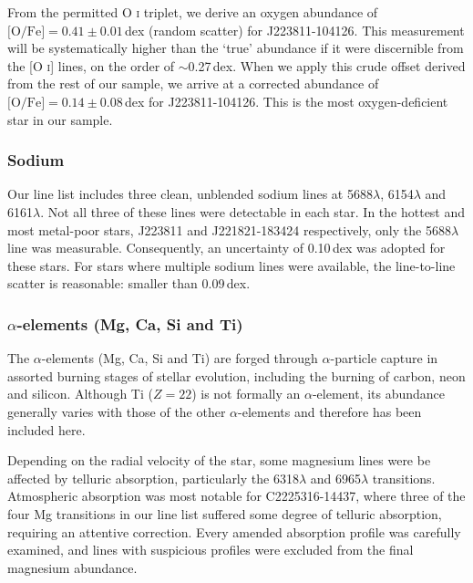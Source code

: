 \documentclass{emulateapj}
\begin{document}
From the permitted O \textsc{i} triplet, we derive an oxygen abundance of $\mbox{[O/Fe]} = 0.41 \pm 0.01$\,dex (random scatter) for J223811-104126. This measurement will be systematically higher than the `true' abundance if it were discernible from the [O \textsc{i}] lines, on the order of ${\sim}$0.27\,dex. When we apply this crude offset derived from the rest of our sample, we arrive at a corrected abundance of $\mbox{[O/Fe]} = 0.14 \pm 0.08$\,dex for J223811-104126. This is the most oxygen-deficient star in our sample.


\subsubsection{Sodium}
\label{sec:sodium-abundances}
Our line list includes three clean, unblended sodium lines at 5688$\lambda$, 6154$\lambda$ and 6161$\lambda$. Not all three of these lines were detectable in each star. In the hottest and most metal-poor stars, J223811 and J221821-183424 respectively, only the 5688$\lambda$ line was measurable. Consequently, an uncertainty of 0.10\,dex was adopted for these stars. For stars where multiple sodium lines were available, the line-to-line scatter is reasonable: smaller than 0.09\,dex. 


\subsubsection{$\alpha$-elements (Mg, Ca, Si and Ti)}
\label{sec:alpha-elements}

The $\alpha$-elements (Mg, Ca, Si and Ti) are forged through $\alpha$-particle capture in assorted burning stages of stellar evolution, including the burning of carbon, neon and silicon. Although Ti ($Z = 22$) is not formally an $\alpha$-element, its abundance generally varies with those of the other $\alpha$-elements and therefore has been included here.

Depending on the radial velocity of the star, some magnesium lines were be affected by telluric absorption, particularly the 6318$\lambda$ and 6965$\lambda$ transitions. Atmospheric absorption was most notable for C2225316-14437, where three of the four Mg transitions in our line list suffered some degree of telluric absorption, requiring an attentive correction. Every amended absorption profile was carefully examined, and lines with suspicious profiles were excluded from the final magnesium abundance.
\end{document}
